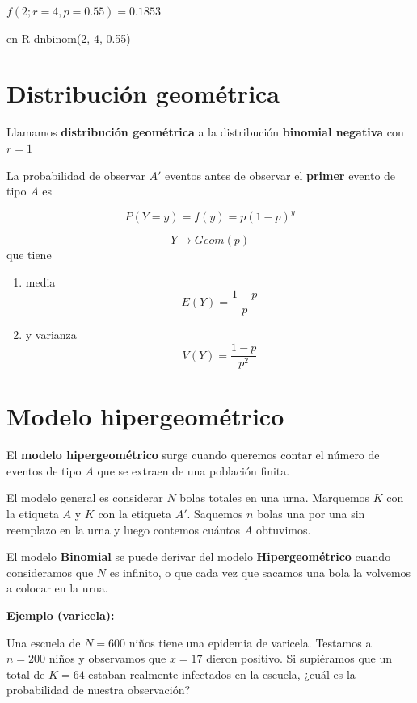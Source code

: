 \documentclass[
]{book}
\begin{document}
\(f(2; r=4, p=0.55)=0.1853\)

en R dnbinom(2, 4, 0.55)

\hypertarget{distribuciuxf3n-geomuxe9trica}{%
\section{Distribución geométrica}\label{distribuciuxf3n-geomuxe9trica}}

Llamamos \textbf{distribución geométrica} a la distribución \textbf{binomial negativa} con \(r=1\)

La probabilidad de observar \(A'\) eventos antes de observar el \textbf{primer} evento de tipo \(A\) es

\[P(Y=y)=f(y)= p(1-p)^y\]

\[Y\rightarrow Geom(p)\]
que tiene

\begin{enumerate}
\def\labelenumi{\arabic{enumi})}
\item
  media \[E(Y)= \frac{1-p}{p}\]
\item
  y varianza \[V(Y)= \frac{1-p}{p^2}\]
\end{enumerate}

\hypertarget{modelo-hipergeomuxe9trico}{%
\section{Modelo hipergeométrico}\label{modelo-hipergeomuxe9trico}}

El \textbf{modelo hipergeométrico} surge cuando queremos contar el número de eventos de tipo \(A\) que se extraen de una población finita.

El modelo general es considerar \(N\) bolas totales en una urna. Marquemos \(K\) con la etiqueta \(A\) y \(K\) con la etiqueta \(A'\). Saquemos \(n\) bolas una por una sin reemplazo en la urna y luego contemos cuántos \(A\) obtuvimos.

El modelo \textbf{Binomial} se puede derivar del modelo \textbf{Hipergeométrico} cuando consideramos que \(N\) es infinito, o que cada vez que sacamos una bola la volvemos a colocar en la urna.

\textbf{Ejemplo (varicela):}

Una escuela de \(N=600\) niños tiene una epidemia de varicela. Testamos a \(n=200\) niños y observamos que \(x=17\) dieron positivo. Si supiéramos que un total de \(K=64\) estaban realmente infectados en la escuela, ¿cuál es la probabilidad de nuestra observación?
\end{document}
